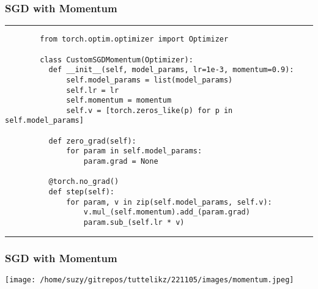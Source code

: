     \begin{frame}[fragile]
      \frametitle{SGD with Momentum}
      \vspace{0.2cm}
      \rule{\textwidth}{1pt}
      \scriptsize
      \begin{verbatim}
        from torch.optim.optimizer import Optimizer

        class CustomSGDMomentum(Optimizer):
          def __init__(self, model_params, lr=1e-3, momentum=0.9):
              self.model_params = list(model_params)
              self.lr = lr
              self.momentum = momentum
              self.v = [torch.zeros_like(p) for p in self.model_params]

          def zero_grad(self):
              for param in self.model_params:
                  param.grad = None

          @torch.no_grad()
          def step(self):
              for param, v in zip(self.model_params, self.v):
                  v.mul_(self.momentum).add_(param.grad)
                  param.sub_(self.lr * v)
      \end{verbatim}
      \rule{\textwidth}{1pt}
    \end{frame}




    \begin{frame}
      \begin{center}
      \frametitle{SGD with Momentum~\cite{qian1999momentum}}
      \texttt{[image: /home/suzy/gitrepos/tuttelikz/221105/images/momentum.jpeg]}
      \end{center}
    \end{frame}



